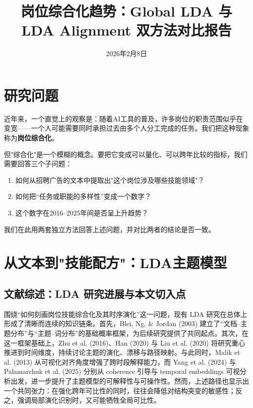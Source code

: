 \documentclass[12pt, a4paper, fontset=none]{ctexart}
\title{\textbf{岗位综合化趋势：Global LDA 与 LDA Alignment 双方法对比报告}}
\date{2026年2月8日}
\begin{document}
\maketitle

\section{研究问题}

近年来，一个直觉上的观察是：随着AI工具的普及，许多岗位的职责范围似乎在变宽——一个人可能需要同时承担过去由多个人分工完成的任务。我们把这种现象称为\textbf{岗位综合化}。

但"综合化"是一个模糊的概念。要把它变成可以量化、可以跨年比较的指标，我们需要回答三个子问题：

\begin{enumerate}
    \item 如何从招聘广告的文本中提取出"这个岗位涉及哪些技能领域"？
    \item 如何把“任务或职能的多样性”变成一个数字？
    \item 这个数字在2016--2025年间是否呈上升趋势？
\end{enumerate}

我们在此用两套独立方法回答上述问题，并对比两者的结论是否一致。

\section{从文本到"技能配方"：LDA主题模型}

\subsection{文献综述：LDA 研究进展与本文切入点}

围绕“如何刻画岗位技能综合化及其时序演化”这一问题，现有 LDA 研究在总体上形成了清晰而连续的知识链条。首先，Blei, Ng, \& Jordan (2003) 建立了“文档--主题分布”与“主题--词分布”的基础概率框架，为后续研究提供了共同起点。其次，在这一框架基础上，Zhu et al. (2016)、Han (2020) 与 Liu et al. (2020) 将研究重心推进到时间维度，持续讨论主题的演化、漂移与路径映射。与此同时，Malik et al. (2013) 从可视化对齐角度增强了跨时段解释能力，而 Yang et al. (2024) 与 Palamarchuk et al. (2025) 分别从 coherence 引导与 temporal embeddings 可视分析出发，进一步提升了主题模型的可解释性与可操作性。然而，上述路径也显示出一个共同张力：在强化跨年可比性的同时，往往会降低对结构突变的敏感性；反之，强调局部演化识别时，又可能牺牲全局可比性。
\end{document}
